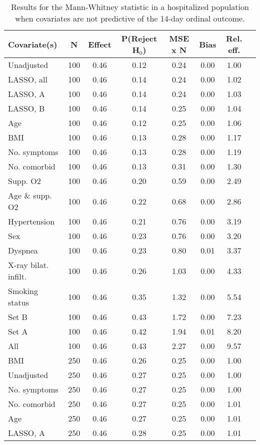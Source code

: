 \documentclass{article}
\begin{document}
{\tabcolsep=6pt  %
\begin{longtable}{lccccccc}
\caption{Results for the Mann-Whitney statistic in a hospitalized population when covariates are not predictive of the 14-day ordinal outcome.}\label{tab24}\\
Covariate(s) & N & Effect & P(Reject H$_0$) & MSE x N & Bias & Rel. eff.\\ \midrule
Unadjusted & 100 & 0.46 & 0.12 & 0.24 & 0.00 & 1.00\\
LASSO, all & 100 & 0.46 & 0.14 & 0.24 & 0.00 & 1.02\\
LASSO, A & 100 & 0.46 & 0.14 & 0.24 & 0.00 & 1.03\\
LASSO, B & 100 & 0.46 & 0.14 & 0.25 & 0.00 & 1.04\\
Age & 100 & 0.46 & 0.12 & 0.25 & 0.00 & 1.06\\
BMI & 100 & 0.46 & 0.13 & 0.28 & 0.00 & 1.17\\
No. symptoms & 100 & 0.46 & 0.13 & 0.28 & 0.00 & 1.19\\
No. comorbid & 100 & 0.46 & 0.13 & 0.31 & 0.00 & 1.30\\
Supp. O2 & 100 & 0.46 & 0.20 & 0.59 & 0.00 & 2.49\\
Age \& supp. O2 & 100 & 0.46 & 0.22 & 0.68 & 0.00 & 2.86\\
Hypertension & 100 & 0.46 & 0.21 & 0.76 & 0.00 & 3.19\\
Sex & 100 & 0.46 & 0.23 & 0.76 & 0.00 & 3.20\\
Dyspnea & 100 & 0.46 & 0.23 & 0.80 & 0.01 & 3.37\\
X-ray bilat. infilt. & 100 & 0.46 & 0.26 & 1.03 & 0.00 & 4.33\\
Smoking status & 100 & 0.46 & 0.35 & 1.32 & 0.00 & 5.54\\
Set B & 100 & 0.46 & 0.43 & 1.72 & 0.00 & 7.23\\
Set A & 100 & 0.46 & 0.42 & 1.94 & 0.01 & 8.20\\
All & 100 & 0.46 & 0.43 & 2.27 & 0.00 & 9.57\\ \midrule
BMI & 250 & 0.46 & 0.26 & 0.25 & 0.00 & 1.00\\
Unadjusted & 250 & 0.46 & 0.27 & 0.25 & 0.00 & 1.00\\
No. symptoms & 250 & 0.46 & 0.27 & 0.25 & 0.00 & 1.00\\
No. comorbid & 250 & 0.46 & 0.27 & 0.25 & 0.00 & 1.01\\
Age & 250 & 0.46 & 0.27 & 0.25 & 0.00 & 1.01\\
LASSO, A & 250 & 0.46 & 0.28 & 0.25 & 0.00 & 1.01\\

\end{longtable}}
\end{document}
